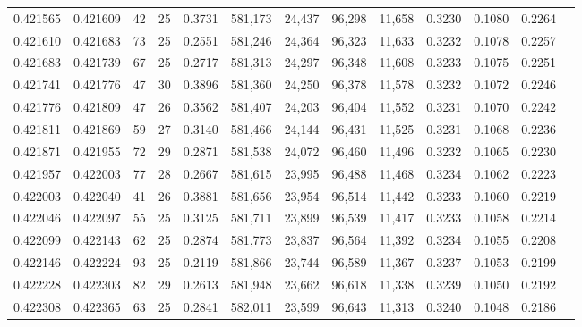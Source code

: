 \begin{tabular}{rrrrrrrrrrrrr}
0.421565 & 0.421609 &    42 &  25 &                                     0.3731 & 581,173 &  24,437 &  96,298 &  11,658 & 0.3230 & 0.1080 & 0.2264 \\
0.421610 & 0.421683 &    73 &  25 &                                     0.2551 & 581,246 &  24,364 &  96,323 &  11,633 & 0.3232 & 0.1078 & 0.2257 \\
0.421683 & 0.421739 &    67 &  25 &                                     0.2717 & 581,313 &  24,297 &  96,348 &  11,608 & 0.3233 & 0.1075 & 0.2251 \\
0.421741 & 0.421776 &    47 &  30 &                                     0.3896 & 581,360 &  24,250 &  96,378 &  11,578 & 0.3232 & 0.1072 & 0.2246 \\
0.421776 & 0.421809 &    47 &  26 &                                     0.3562 & 581,407 &  24,203 &  96,404 &  11,552 & 0.3231 & 0.1070 & 0.2242 \\
0.421811 & 0.421869 &    59 &  27 &                                     0.3140 & 581,466 &  24,144 &  96,431 &  11,525 & 0.3231 & 0.1068 & 0.2236 \\
0.421871 & 0.421955 &    72 &  29 &                                     0.2871 & 581,538 &  24,072 &  96,460 &  11,496 & 0.3232 & 0.1065 & 0.2230 \\
0.421957 & 0.422003 &    77 &  28 &                                     0.2667 & 581,615 &  23,995 &  96,488 &  11,468 & 0.3234 & 0.1062 & 0.2223 \\
0.422003 & 0.422040 &    41 &  26 &                                     0.3881 & 581,656 &  23,954 &  96,514 &  11,442 & 0.3233 & 0.1060 & 0.2219 \\
0.422046 & 0.422097 &    55 &  25 &                                     0.3125 & 581,711 &  23,899 &  96,539 &  11,417 & 0.3233 & 0.1058 & 0.2214 \\
0.422099 & 0.422143 &    62 &  25 &                                     0.2874 & 581,773 &  23,837 &  96,564 &  11,392 & 0.3234 & 0.1055 & 0.2208 \\
0.422146 & 0.422224 &    93 &  25 &                                     0.2119 & 581,866 &  23,744 &  96,589 &  11,367 & 0.3237 & 0.1053 & 0.2199 \\
0.422228 & 0.422303 &    82 &  29 &                                     0.2613 & 581,948 &  23,662 &  96,618 &  11,338 & 0.3239 & 0.1050 & 0.2192 \\
0.422308 & 0.422365 &    63 &  25 &                                     0.2841 & 582,011 &  23,599 &  96,643 &  11,313 & 0.3240 & 0.1048 & 0.2186 \\

\end{tabular}
